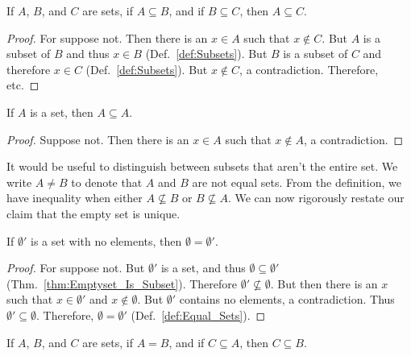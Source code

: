         \begin{theorem}
            \label{thm:Subset_is_Transitive}%
            If $A$, $B$, and $C$ are sets, if $A\subseteq{B}$, and if
            $B\subseteq{C}$, then $A\subseteq{C}$.
        \end{theorem}
        \begin{proof}
            For suppose not. Then there is an $x\in{A}$ such that
            $x\notin{C}$. But $A$ is a subset of $B$ and thus $x\in{B}$
            (Def.~\ref{def:Subsets}). But $B$ is a subset of $C$ and
            therefore $x\in{C}$ (Def.~\ref{def:Subsets}). But $x\notin{C}$,
            a contradiction. Therefore, etc.
        \end{proof}
        \begin{theorem}
            \label{thm:Set_Is_Subset_Of_Self}%
            If $A$ is a set, then $A\subseteq{A}$.
        \end{theorem}
        \begin{proof}
            Suppose not. Then there is an $x\in{A}$
            such that $x\notin{A}$, a contradiction.
        \end{proof}
        It would be useful to distinguish between subsets that aren't the
        entire set.
        We write $A\ne{B}$ to denote that $A$ and $B$ are not equal sets.
        From the definition, we have inequality when either
        $A\nsubseteq{B}$ or $B\nsubseteq{A}$. We can now rigorously restate
        our claim that the empty set is unique.
        \begin{theorem}
            If $\emptyset'$ is a set with no elements,
            then $\emptyset=\emptyset'$.
        \end{theorem}
        \begin{proof}
            For suppose not. But $\emptyset'$ is a set, and thus
            $\emptyset\subseteq\emptyset'$
            (Thm.~\ref{thm:Emptyset_Is_Subset}). Therefore
            $\emptyset'\nsubseteq\emptyset$. But then there is an $x$ such
            that $x\in\emptyset'$ and $x\notin\emptyset$. But $\emptyset'$
            contains no elements, a contradiction. Thus
            $\emptyset'\subseteq\emptyset$. Therefore,
            $\emptyset=\emptyset'$ (Def.~\ref{def:Equal_Sets}).
        \end{proof}
        \begin{theorem}
            \label{thm:Subsets_of_Equal_Sets}%
            If $A$, $B$, and $C$ are sets, if $A=B$, and if
            $C\subseteq{A}$, then $C\subseteq{B}$.
        \end{theorem}
